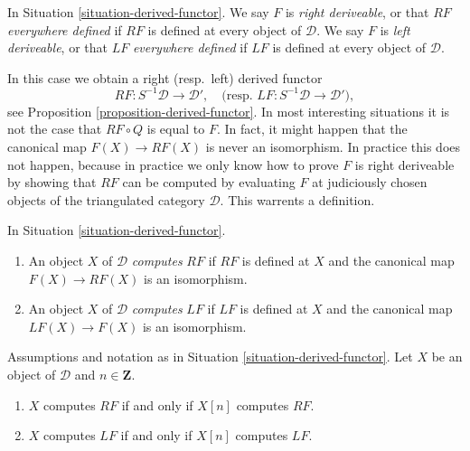 \begin{definition}
\label{definition-everywhere-defined}
In
Situation \ref{situation-derived-functor}.
We say $F$ is {\it right deriveable}, or that $RF$ {\it everywhere defined}
if $RF$ is defined at every object of $\mathcal{D}$.
We say $F$ is {\it left deriveable}, or that $LF$ {\it everywhere defined}
if $LF$ is defined at every object of $\mathcal{D}$.
\end{definition}

\noindent
In this case we obtain a right (resp.\ left) derived functor
\begin{equation}
\label{equation-everywhere}
RF : S^{-1}\mathcal{D} \longrightarrow \mathcal{D}',
\quad\text{(resp. }
LF : S^{-1}\mathcal{D} \longrightarrow \mathcal{D}'),
\end{equation}
see
Proposition \ref{proposition-derived-functor}.
In most interesting situations it is not the case that $RF \circ Q$ is
equal to $F$. In fact, it might happen that the canonical map
$F(X) \to RF(X)$ is never an isomorphism. In practice this does not happen,
because in practice we only know how to prove $F$ is right deriveable by
showing that $RF$ can be computed by evaluating $F$ at judiciously chosen
objects of the triangulated category $\mathcal{D}$. This warrents
a definition.

\begin{definition}
\label{definition-computes}
In
Situation \ref{situation-derived-functor}.
\begin{enumerate}
\item An object $X$ of $\mathcal{D}$ {\it computes} $RF$ if $RF$ is defined
at $X$ and the canonical map $F(X) \to RF(X)$ is an isomorphism.
\item An object $X$ of $\mathcal{D}$ {\it computes} $LF$ if $LF$ is defined
at $X$ and the canonical map $LF(X) \to F(X)$ is an isomorphism.
\end{enumerate}
\end{definition}

\begin{lemma}
\label{lemma-computes-shift}
Assumptions and notation as in
Situation \ref{situation-derived-functor}.
Let $X$ be an object of $\mathcal{D}$ and $n \in \mathbf{Z}$.
\begin{enumerate}
\item $X$ computes $RF$ if and only if $X[n]$ computes $RF$.
\item $X$ computes $LF$ if and only if $X[n]$ computes $LF$.
\end{enumerate}
\end{lemma}

